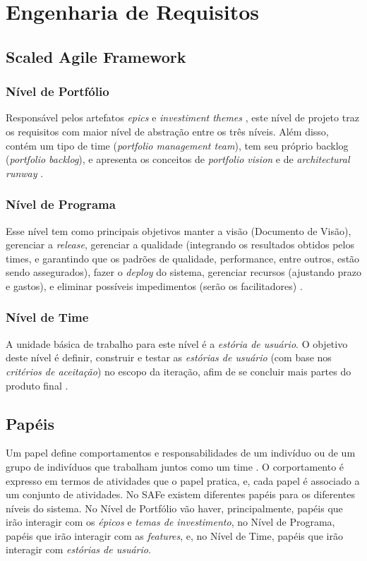 \chapter[Engenharia de Requisitos]{Engenharia de Requisitos}

\section{Scaled Agile Framework}
\subsection{Nível de Portfólio}
Responsável pelos artefatos \emph{epics} e \emph{investiment themes} \cite{safe005}, este nível de projeto traz os requisitos com maior nível de abstração entre os três níveis. Além disso, contém um tipo de time (\emph{portfolio management team}), tem seu próprio backlog (\emph{portfolio backlog}), e apresenta os conceitos de \emph{portfolio vision} e de \emph{architectural runway} \cite{safe005}.

\subsection{Nível de Programa}
Esse nível tem como principais objetivos manter a visão (Documento de Visão), gerenciar a \emph{release}, gerenciar a qualidade (integrando os resultados obtidos pelos times, e garantindo que os padrões de qualidade, performance, entre outros, estão sendo assegurados), fazer o \emph{deploy} do sistema, gerenciar recursos (ajustando prazo e gastos), e eliminar possíveis impedimentos (serão os facilitadores) \cite{safe002}.

\subsection{Nível de Time}
A unidade básica de trabalho para este nível é a \emph{estória de usuário}. O objetivo deste nível é definir, construir e testar as \emph{estórias de usuário} (com base nos \emph{critérios de aceitação}) no escopo da iteração, afim de se concluir mais partes do produto final \cite{safe001}.

\section{Papéis}
Um papel define comportamentos e responsabilidades de um indivíduo ou de um grupo de indivíduos que trabalham juntos como um time \cite{kruchten002}. O corportamento é expresso em termos de atividades que o papel pratica, e, cada papel é associado a um conjunto de atividades. No SAFe existem diferentes papéis para os diferentes níveis do sistema. No Nível de Portfólio vão haver, principalmente, papéis que irão interagir com os \emph{épicos} e \emph{temas de investimento}, no Nível de Programa, papéis que irão interagir com as \emph{features}, e, no Nível de Time, papéis que irão interagir com \emph{estórias de usuário}.

